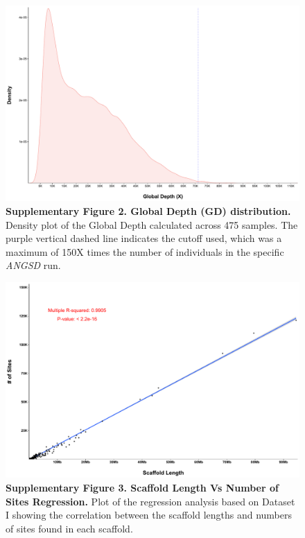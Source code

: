 \documentclass[twoside, british, a4paper]{article}
\begin{document}
\begin{figure}
\centering
\includegraphics[width=1\textwidth]{../FPG--Pipeline/FPG--Plots/FPG--Stats/FPG--GlobalCoverage/FPG--GlobalCoverage.pdf}
\captionsetup{labelformat=empty}
\caption[Supplementary Figure 2. Global Depth (GD) distribution.]{\textbf{Supplementary Figure 2. Global Depth (GD) distribution.} Density plot of the Global Depth calculated across 475 samples. The purple vertical dashed line indicates the cutoff used, which was a maximum of 150X times the number of individuals in the specific \textit{ANGSD} run.}
\label{SI:FPG--CovDistribution}
\end{figure}

\newpage
\clearpage

\begin{figure}
\centering
\includegraphics[width=1\textwidth]{../FPG--Pipeline/FPG--Plots/FPG--Stats/FPG--SitesInfo/FPG--Sites-ScaffoldsRegression.pdf}
\captionsetup{labelformat=empty}
\caption[Supplementary Figure 3. Scaffold Length Vs Number of Sites Regression.]{\textbf{Supplementary Figure 3. Scaffold Length Vs Number of Sites Regression.} Plot of the regression analysis based on Dataset I showing the correlation between the scaffold lengths and numbers of sites found in each scaffold.}
\label{SI:FPG--SitesInfo}
\end{figure}
\end{document}
